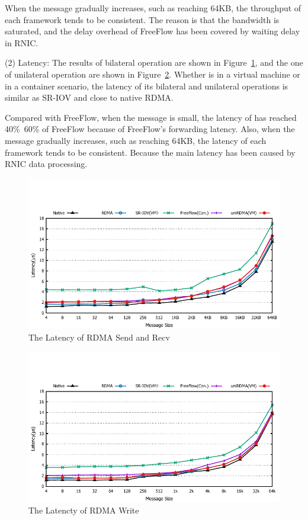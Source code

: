 When the message gradually increases, such as reaching 64KB, the throughput of each framework tends to be consistent. The reason is that the bandwidth is saturated, and the delay overhead of FreeFlow has been covered by waiting delay in RNIC.

(2) Latency: The results of bilateral operation are shown in Figure~\ref{fig:send-lat}, and the one of unilateral operation are shown in Figure~\ref{fig:write-lat}. Whether \sys is in a virtual machine or in a container scenario, the latency of its bilateral and unilateral operations is similar as SR-IOV and close to native RDMA.

Compared with FreeFlow, when the message is small, the latency of \sys has reached 40\%~60\% of FreeFlow because of FreeFlow's forwarding latency. Also, when the message gradually increases, such as reaching 64KB, the latency of each framework tends to be consistent. Because the main latency has been caused by RNIC data processing.

\begin{figure}[!ht]
	\centering
	\includegraphics[width=1.0\linewidth]{images/send-lat.pdf}
	\caption{The Latency of RDMA Send and Recv}
	\label{fig:send-lat}
\end{figure}

\begin{figure}[!ht]
	\centering
	\includegraphics[width=1.0\linewidth]{images/write-lat.pdf}
	\caption{The Latencty of RDMA Write}
	\label{fig:write-lat}
\end{figure}


